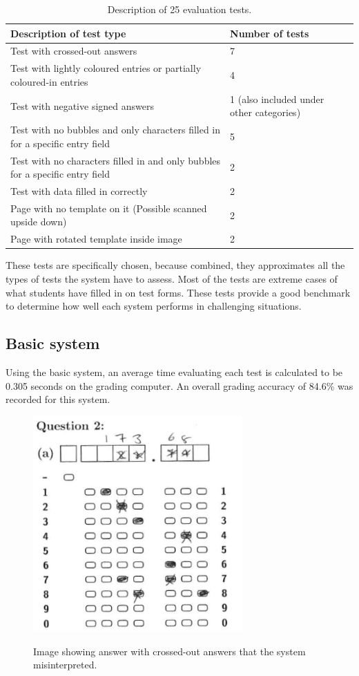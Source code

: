 \begin{table}
\caption{Description of 25 evaluation tests.} \label{tbl:25Tests}
  \centering
\begin{tabular}{|p{6cm}|p{4cm}|}
\hline
\textbf{Description of test type}&\textbf{Number of tests}\\
\hline
Test with crossed-out answers&7\\
\hline
Test with lightly coloured entries or partially coloured-in entries&4\\
\hline
Test with negative signed answers&1 (also included under other categories)\\
\hline
Test with no bubbles and only characters filled in for a specific entry field &5\\
\hline
Test with no characters filled in and only bubbles for a specific entry field&2\\
\hline
Test with data filled in correctly&2\\
\hline
Page with no template on it (Possible scanned upside down)&2\\
\hline
Page with rotated template inside image&2\\
\hline
\end{tabular} 
\end{table}

These tests are specifically chosen, because combined, they approximates all the types of tests the system have to assess. Most of the tests are extreme cases of what students have filled in on test forms. These tests provide a good benchmark to determine how well each system performs in challenging situations.

\subsection{Basic system}
Using the basic system, an average time evaluating each test is calculated to be 0.305 seconds on the grading computer. An overall grading accuracy of 84.6\% was recorded for this system.

\begin{figure}
  \centering
  \includegraphics[width=8cm]{crossClash}\\
  \caption{Image showing answer with crossed-out answers that the system misinterpreted.}
  \label{fig:crossClash}
\end{figure}

